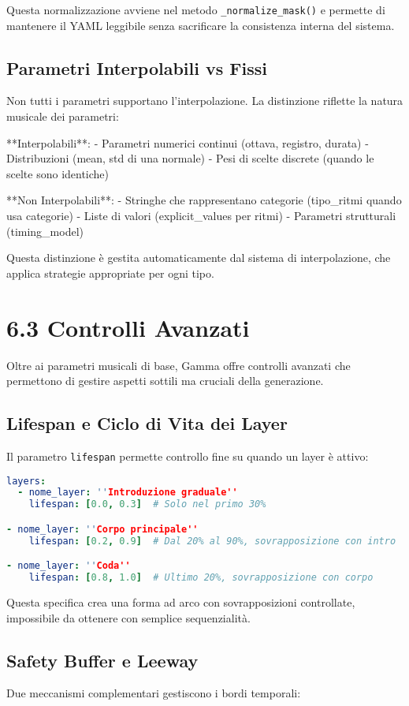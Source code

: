 Questa normalizzazione avviene nel metodo \texttt{\_normalize\_mask()} e permette di mantenere il YAML leggibile senza sacrificare la consistenza interna del sistema.
\subsection{Parametri Interpolabili vs Fissi}
Non tutti i parametri supportano l'interpolazione. La distinzione riflette la natura musicale dei parametri:

**Interpolabili**:
- Parametri numerici continui (ottava, registro, durata)
- Distribuzioni (mean, std di una normale)
- Pesi di scelte discrete (quando le scelte sono identiche)

**Non Interpolabili**:
- Stringhe che rappresentano categorie (tipo_ritmi quando usa categorie)
- Liste di valori (explicit_values per ritmi)
- Parametri strutturali (timing_model)

Questa distinzione è gestita automaticamente dal sistema di interpolazione, che applica strategie appropriate per ogni tipo.
\section{6.3 Controlli Avanzati}
Oltre ai parametri musicali di base, Gamma offre controlli avanzati che permettono di gestire aspetti sottili ma cruciali della generazione.
\subsection{Lifespan e Ciclo di Vita dei Layer}
Il parametro \texttt{lifespan} permette controllo fine su quando un layer è attivo:

\begin{lstlisting}[language=Yaml]
layers:
  - nome_layer: ''Introduzione graduale''
    lifespan: [0.0, 0.3]  # Solo nel primo 30%

- nome_layer: ''Corpo principale''  
    lifespan: [0.2, 0.9]  # Dal 20% al 90%, sovrapposizione con intro

- nome_layer: ''Coda''
    lifespan: [0.8, 1.0]  # Ultimo 20%, sovrapposizione con corpo
\end{lstlisting}

Questa specifica crea una forma ad arco con sovrapposizioni controllate, impossibile da ottenere con semplice sequenzialità.
\subsection{Safety Buffer e Leeway}
Due meccanismi complementari gestiscono i bordi temporali:

